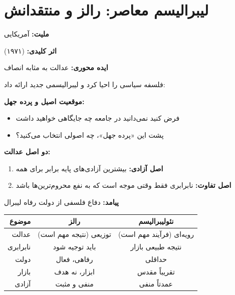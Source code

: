 \section{لیبرالیسم معاصر: رالز و منتقدانش}

\begin{personbox}

\textbf{ملیت:} آمریکایی

\textbf{اثر کلیدی:}  (۱۹۷۱)

\textbf{ایده محوری:} عدالت به مثابه انصاف

\mediumspace

 فلسفه سیاسی را احیا کرد و لیبرالیسمی جدید ارائه داد:

\textbf{موقعیت اصیل و پرده جهل:}
\begin{itemize}[nosep]
    \item فرض کنید نمی‌دانید در جامعه چه جایگاهی خواهید داشت
    \item پشت این «پرده جهل»، چه اصولی انتخاب می‌کنید؟
\end{itemize}

\textbf{دو اصل عدالت:}
\begin{enumerate}[nosep]
    \item \textbf{اصل آزادی:} بیشترین آزادی‌های پایه برابر برای همه
    \item \textbf{اصل تفاوت:} نابرابری فقط وقتی موجه است که به نفع محروم‌ترین‌ها باشد
\end{enumerate}

\mediumspace

\textbf{پیامد:} دفاع فلسفی از دولت رفاه لیبرال
\end{personbox}

\begin{comparebox}
\begin{table}[H]
\centering
\begin{tabular}{r|c|c}
\toprule
\textbf{موضوع} & \textbf{رالز} & \textbf{نئولیبرالیسم} \\
\midrule
عدالت & توزیعی (نتیجه مهم است) & رویه‌ای (فرآیند مهم است) \\
نابرابری & باید توجیه شود & نتیجه طبیعی بازار \\
دولت & رفاهی، فعال & حداقلی \\
بازار & ابزار، نه هدف & تقریباً مقدس \\
آزادی & منفی و مثبت & عمدتاً منفی \\
\bottomrule
\end{tabular}
\end{table}
\end{comparebox}

